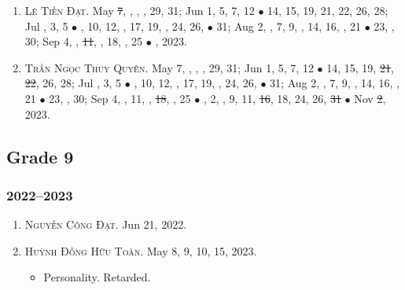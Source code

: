 \documentclass{article}
\begin{document}
\begin{enumerate}
	\item \textsc{Lê Tiến Đạt.} May \st{7}, , , , 29, 31; Jun 1, 5, 7, 12 $\bullet$ 14, 15, 19, 21, 22, 26, 28; Jul , 3, 5 $\bullet$ , 10, 12, , 17, 19, , 24, 26,  $\bullet$ 31; Aug 2, , 7, 9, , 14, 16, , 21 $\bullet$ 23, , 30; Sep 4, , \st{11}, , 18, , 25 $\bullet$ , 2023. {\sf[Out]}
	\item \textsc{Trần Ngọc Thúy Quyên.} May 7, , , , 29, 31; Jun 1, 5, 7, 12 $\bullet$ 14, 15, 19, \st{21}, \st{22}, 26, 28; Jul , 3, 5 $\bullet$ , 10, 12, , 17, 19, , 24, 26,  $\bullet$ 31; Aug 2, , 7, 9, , 14, 16, , 21 $\bullet$ 23, , 30; Sep 4, , 11, , \st{18}, , 25 $\bullet$ , 2, , 9, 11, \st{16}, 18, 24, 26, \st{31} $\bullet$ Nov \st{2}, 2023.
\end{enumerate}


\subsection{Grade 9}

\subsubsection{2022--2023}

\begin{enumerate}
	\item \textsc{Nguyễn Công Đạt.} {\sf[In]} Jun 21, 2022. {\sf[Out]}
	\item \textsc{Huỳnh Đồng Hữu Toàn.} {\sf[In]} May 8, 9, 10, 15, 2023. {\sf[Out]}
	\begin{itemize}
		\item {\sf Personality.} Retarded.
	\end{itemize}
\end{enumerate}
\end{document}
